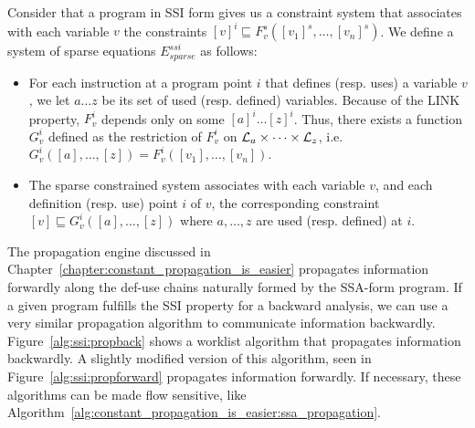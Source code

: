 \begin{definition}
\label{def:ssi_eq}
Consider that a program in SSI form gives us a constraint system that associates with each variable $v$ the constraints $[v]^i \sqsubseteq  F_v^s([v_1]^s, \dots, [v_n]^s)$. We define a system of sparse equations $E^{ssi}_{sparse}$ as follows:

\begin{itemize}

\item For each instruction at a program point $i$ that defines (resp. uses) a variable $v$, we let $a \dots z$ be its set of used (resp. defined) variables. Because of the LINK property, $F^i_v$ depends only on some $[a]^i \dots [z]^i$.
Thus, there exists a function $G^i_v$ defined as the restriction of $F^i_v$ on ${\cal L}_a\times \dots \times{\cal L}_z$, i.e. $G^i_v([a], \dots, [z]) = F^i_v([v_1],\dots, [v_n])$.

\item The sparse constrained system associates with each variable $v$, and each definition (resp. use) point $i$ of $v$, the corresponding constraint $[v]  \sqsubseteq G_v^i([a], \ldots, [z])$ where $a,\dots, z$ are used (resp. defined) at $i$.
\end{itemize}

\end{definition}

The propagation engine discussed in Chapter~\ref{chapter:constant_propagation_is_easier} propagates information forwardly along the def-use chains naturally formed by the SSA-form program.
If a given program fulfills the SSI property for a backward analysis, we can use a very similar propagation algorithm to communicate information backwardly.
Figure~\ref{alg:ssi:propback} shows a worklist algorithm that propagates information backwardly.
A slightly modified version of this algorithm, seen in Figure~\ref{alg:ssi:propforward} propagates information forwardly.
If necessary, these algorithms can be made flow sensitive, like Algorithm~\ref{alg:constant_propagation_is_easier:ssa_propagation}. 


\def\1{\qquad}
\def\2{\1\1}
\def\3{\2\1}
\def\4{\2\2}
\def\5{\3\2}
\def\6{\4\2}
\def\7{\5\2}
\def\8{\6\2}
\def\9{\7\2}
\def\If{{\sf  if }}
\def\Let{{\sf  let }}
\def\Then{{\sf  then }}
\def\Else{{\sf  else}}
\def\Foreach{{\sf foreach }}
\def\For{{\sf for }}
\def\While{{\sf while }}


